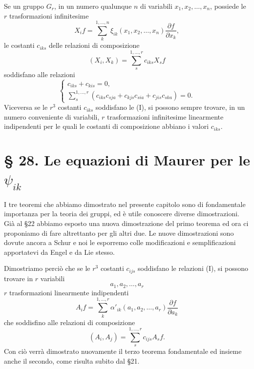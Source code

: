 \documentclass[11pt]{book}
\begin{document}
Se un gruppo $G_r$, in un numero qualunque $n$ di variabili $x_1,x_2,\ldots,x_n$, possiede le $r$ trasformazioni infinitesime
\[
 X_i f=\sum\limits_k^{1,\ldots,n}\xi_{ik}(x_1,x_2,\ldots,x_n)\frac{\partial f}{\partial x_k},
\]
le costanti $c_{iks}$ delle relazioni di composizione
\[
 (X_i,X_k)=\sum\limits_s^{1,\ldots,r} c_{iks}X_s f
\]
soddisfano alle relazioni
\[
\left\{
\begin{array}{l}
 c_{iks}+c_{kis}=0,\\[0.4em]
 \displaystyle\sum\limits_s^{1,\ldots,r}
 \left(c_{iks}c_{sja}+c_{kjs}c_{sia}+c_{jis}c_{ska}\right)=0.
\end{array}
\right.
\tag{I}
\]
Viceversa se le $r^3$ costanti $c_{iks}$ soddisfano le (I), si possono sempre trovare, in un numero conveniente di variabili, $r$ trasformazioni infinitesime linearmente indipendenti per le quali le costanti di composizione abbiano i valori $c_{iks}$.

\section*{\S{} 28. Le equazioni di Maurer per le $\psi_{ik}$}

I tre teoremi che abbiamo dimostrato nel presente capitolo sono di fondamentale importanza per la teoria dei gruppi, ed è utile conoscere diverse dimostrazioni. Già al \S{}22 abbiamo esposto una nuova dimostrazione del primo teorema ed ora ci proponiamo di fare altrettanto per gli altri due. Le nuove dimostrazioni sono dovute ancora a Schur e noi le esporremo colle modificazioni e semplificazioni apportatevi da Engel e da Lie stesso.

Dimostriamo perciò che se le $r^3$ costanti $c_{ijs}$ soddisfano le relazioni (I), si possono trovare in $r$ variabili
\[
 a_1,a_2,\ldots,a_r
\]
$r$ trasformazioni linearmente indipendenti
\begin{equation*}\tag{19}
 A_i f=\sum\limits_k^{1,\ldots,r}\alpha'_{ik}(a_1,a_2,\ldots,a_r)
        \frac{\partial f}{\partial a_k}
\end{equation*}
che soddisfino alle relazioni di composizione
\begin{equation*}\tag{20}
 (A_i,A_j)=\sum\limits_s^{1,\ldots,r}c_{ijs}A_sf.
\end{equation*}
Con ciò verrà dimostrato nuovamente il terzo teorema fondamentale ed insieme anche il secondo, come risulta subito dal \S{}21.
\end{document}
